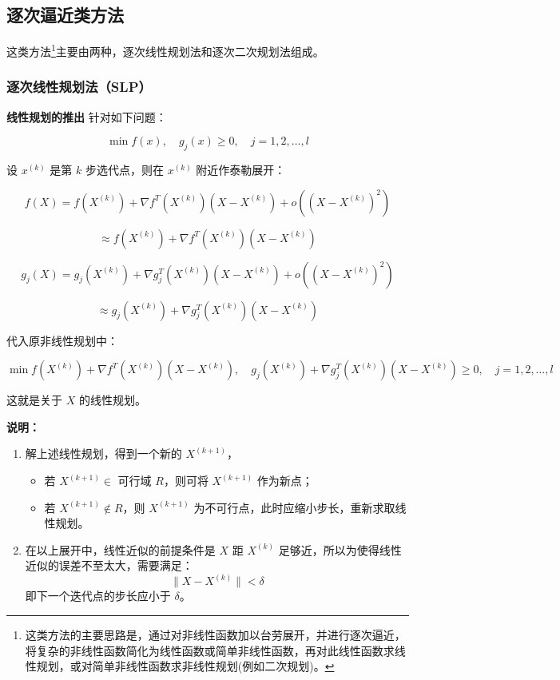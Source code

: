 \subsection{逐次逼近类方法}
\label{sec:逐次逼近类方法}
这类方法\footnote{这类方法的主要思路是，通过对非线性函数加以台劳展开，并进行逐次逼近，将复杂的非线性函数简化为线性函数或简单非线性函数，再对此线性函数求线性规划，或对简单非线性函数求非线性规划(例如二次规划)。}主要由两种，逐次线性规划法和逐次二次规划法组成。
\subsubsection{逐次线性规划法（SLP）}
\begin{thmbox}{\textbf{线性规划的推出}}
针对如下问题：

\[
\min f(x), \quad g_j(x) \geq 0, \quad j = 1, 2, \dots, l
\]

设 \( x^{(k)} \) 是第 \( k \) 步选代点，则在 \( x^{(k)} \) 附近作泰勒展开：

\[
f(X) = f(X^{(k)}) + \nabla f^T(X^{(k)})(X - X^{(k)}) + o((X - X^{(k)})^2)
\]

\[
\approx f(X^{(k)}) + \nabla f^T(X^{(k)})(X - X^{(k)})
\]

\[
g_j(X) = g_j(X^{(k)}) + \nabla g_j^T(X^{(k)})(X - X^{(k)}) + o((X - X^{(k)})^2)
\]

\[
\approx g_j(X^{(k)}) + \nabla g_j^T(X^{(k)})(X - X^{(k)})
\]

代入原非线性规划中：

\[
\min f(X^{(k)}) + \nabla f^T(X^{(k)})(X - X^{(k)}), \quad g_j(X^{(k)}) + \nabla g_j^T(X^{(k)})(X - X^{(k)}) \geq 0, \quad j = 1, 2, \dots, l
\]

这就是关于 \( X \) 的线性规划。
\end{thmbox}

\textbf{说明：}
\begin{enumerate}
    \item 解上述线性规划，得到一个新的 \( X^{(k+1)} \)，
    \begin{itemize}
        \item 若 \( X^{(k+1)} \in \) 可行域 \( R \)，则可将 \( X^{(k+1)} \) 作为新点；
        \item 若 \( X^{(k+1)} \notin R \)，则 \( X^{(k+1)} \) 为不可行点，此时应缩小步长，重新求取线性规划。
    \end{itemize}
    \item 在以上展开中，线性近似的前提条件是 \( X \) 距 \( X^{(k)} \) 足够近，所以为使得线性近似的误差不至太大，需要满足：
\[
\| X - X^{(k)} \| < \delta
\]
即下一个迭代点的步长应小于 \( \delta \)。
\end{enumerate}


